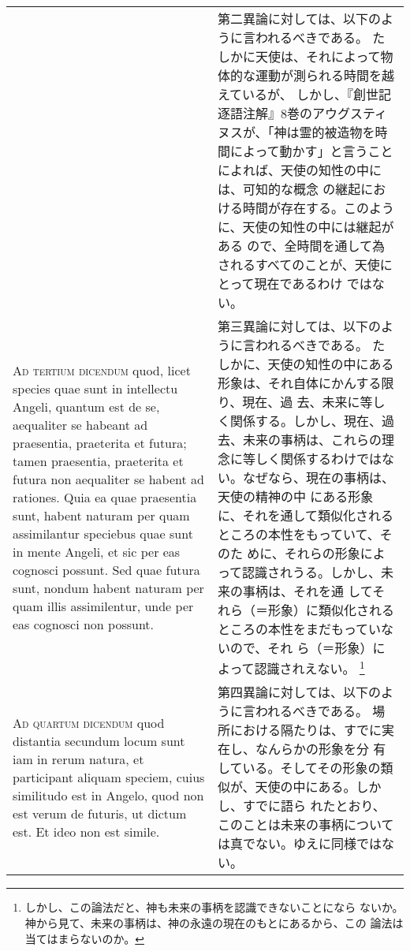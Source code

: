 \documentclass[10pt]{jsarticle} %
\begin{document}
\begin{longtable}{p{21em}p{21em}}
&

 第二異論に対しては、以下のように言われるべきである。
 たしかに天使は、それによって物体的な運動が測られる時間を越えているが、
 しかし、『創世記逐語注解』8巻のアウグスティヌスが、「神は霊的被造物を時
 間によって動かす」と言うことによれば、天使の知性の中には、可知的な概念
 の継起における時間が存在する。このように、天使の知性の中には継起がある
 ので、全時間を通して為されるすべてのことが、天使にとって現在であるわけ
 ではない。

 
\\


{\scshape Ad tertium dicendum} quod, licet species quae
sunt in intellectu Angeli, quantum est de se, aequaliter se habeant ad
praesentia, praeterita et futura; tamen praesentia, praeterita et futura
non aequaliter se habent ad rationes. Quia ea quae praesentia sunt,
habent naturam per quam assimilantur speciebus quae sunt in mente
Angeli, et sic per eas cognosci possunt. Sed quae futura sunt, nondum
habent naturam per quam illis assimilentur, unde per eas cognosci non
possunt.

&

 第三異論に対しては、以下のように言われるべきである。
 たしかに、天使の知性の中にある形象は、それ自体にかんする限り、現在、過
 去、未来に等しく関係する。しかし、現在、過去、未来の事柄は、これらの理
 念に等しく関係するわけではない。なぜなら、現在の事柄は、天使の精神の中
 にある形象に、それを通して類似化されるところの本性をもっていて、そのた
 めに、それらの形象によって認識されうる。しかし、未来の事柄は、それを通
 してそれら（＝形象）に類似化されるところの本性をまだもっていないので、それ
 ら（＝形象）によって認識されえない。
 \footnote{しかし、この論法だと、神も未来の事柄を認識できないことになら
 ないか。神から見て、未来の事柄は、神の永遠の現在のもとにあるから、この
 論法は当てはまらないのか。}

\\


{\scshape Ad quartum dicendum} quod distantia secundum
locum sunt iam in rerum natura, et participant aliquam speciem, cuius
similitudo est in Angelo, quod non est verum de futuris, ut dictum
est. Et ideo non est simile.

&


 第四異論に対しては、以下のように言われるべきである。
 場所における隔たりは、すでに実在し、なんらかの形象を分
 有している。そしてその形象の類似が、天使の中にある。しかし、すでに語ら
 れたとおり、このことは未来の事柄については真でない。ゆえに同様ではない。

\end{longtable}
\newpage
\end{document}
